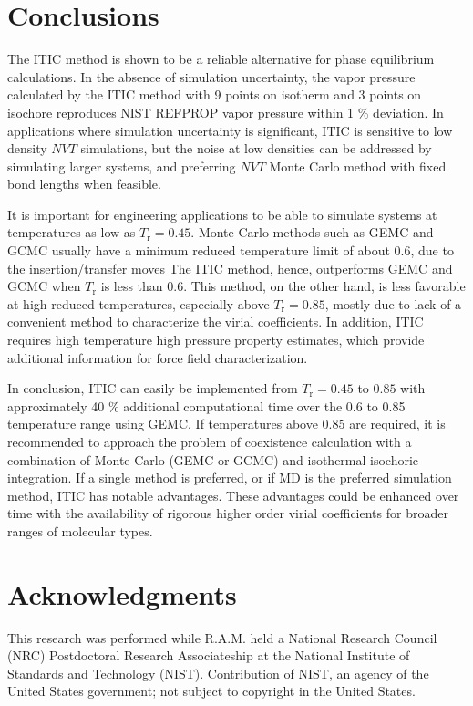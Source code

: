 \documentclass[5p,times]{elsarticle}
\begin{document}
\section{Conclusions} \label{sec:conclusion} 
The ITIC method is shown to be a reliable alternative for phase equilibrium calculations. In the absence of simulation uncertainty, the vapor pressure calculated by the ITIC method with 9 points on isotherm and 3 points on isochore reproduces NIST REFPROP vapor pressure within 1 \% deviation. In applications where simulation uncertainty is significant, ITIC is sensitive to low density $NVT$ simulations, but the noise at low densities can be addressed by simulating larger systems, and preferring $NVT$ Monte Carlo method with fixed bond lengths when feasible.

It is important for engineering applications to be able to simulate systems at temperatures as low as $T_\mathrm{r}=0.45$. Monte Carlo methods such as GEMC and GCMC usually have a minimum reduced temperature limit of about 0.6, due to the insertion/transfer moves The ITIC method, hence, outperforms GEMC and GCMC when $T_\mathrm{r}$ is less than 0.6. This method, on the other hand, is less favorable at high reduced temperatures, especially above $T_\mathrm{r}=0.85$, mostly due to lack of a convenient method to characterize the virial coefficients. In addition, ITIC requires high temperature high pressure property estimates, which provide additional information for force field characterization.

In conclusion, ITIC can easily be implemented from $T_\mathrm{r} = 0.45$ to $0.85$ with approximately 40 \% additional computational time over the 0.6 to 0.85 temperature range using GEMC. If temperatures above 0.85 are required, it is recommended to approach the problem of coexistence calculation with a combination of Monte Carlo (GEMC or GCMC) and isothermal-isochoric integration. If a single method is preferred, or if MD is the preferred simulation method, ITIC has notable advantages. These advantages could be enhanced over time with the availability of rigorous higher order virial coefficients for broader ranges of molecular types. 

\section{Acknowledgments}

This research was performed while R.A.M. held a National Research Council (NRC) Postdoctoral Research Associateship at the National Institute of Standards and Technology (NIST). Contribution of NIST, an agency of the United States government; not subject to copyright in the United States.
\end{document}
